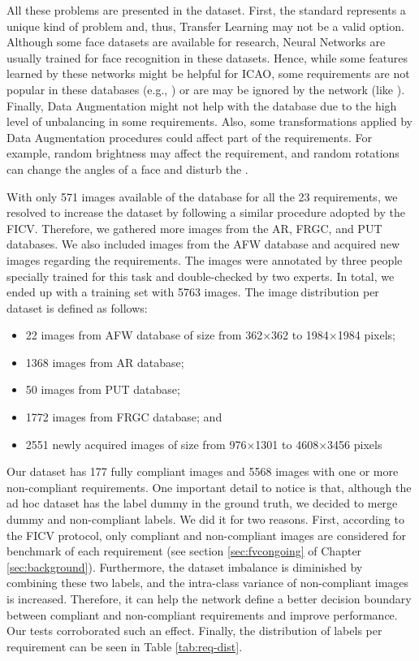  All these problems are presented in the \ficvtest dataset. First, the \icao standard represents a unique kind of problem and, thus, Transfer Learning may not be a valid option. Although some face datasets are available for research, Neural Networks are usually trained for face recognition in these datasets. Hence, while some features learned by these networks might be helpful for ICAO, some requirements are not popular in these databases (e.g., \citeReq{\inkmarked}) or are may be ignored by the network (like \citeReq{\variedbackground}). Finally, Data Augmentation might not help with the \ficvtest database due to the high level of unbalancing in some requirements. Also, some transformations applied by Data Augmentation procedures could affect part of the requirements. For example, random brightness may affect the  \citeReq{\toodarklight} requirement, and random rotations can change the angles of a face and disturb the \citeReq{\rollpitchyaw}.
 
 With only 571 images available of the \ficvtest database for all the 23 requirements, we resolved to increase the dataset by following a similar procedure adopted by the FICV. Therefore, we gathered more images from the AR, FRGC, and PUT databases. We also included images from the AFW database \citep{databaseAFW} and acquired new images regarding the \icao requirements. The images were annotated by three people specially trained for this task and double-checked by two experts. In total, we ended up with a training set with 5763 images. The image distribution per dataset is defined as follows:

\begin{itemize}
\item 22 images from AFW database of size from 362$\times$362 to 1984$\times$1984 pixels;
\item 1368 images from AR database;
\item 50 images from PUT database;
\item 1772 images from FRGC database; and
\item 2551 newly acquired images of size from 976$\times$1301 to 4608$\times$3456 pixels
\end{itemize}

Our dataset has 177 fully compliant images and 5568 images with one or more non-compliant requirements. One important detail to notice is that, although the ad hoc dataset has the label dummy in the ground truth, we decided to merge dummy and non-compliant labels. We did it for two reasons. First, according to the FICV protocol, only compliant and non-compliant images are considered for benchmark of each requirement (see section \ref{sec:fvcongoing} of Chapter \ref{sec:background}). Furthermore, the dataset imbalance is diminished by combining these two labels, and the intra-class variance of non-compliant images is increased. Therefore, it can help the network define a better decision boundary between compliant and non-compliant requirements and improve performance. Our tests corroborated such an effect. Finally, the distribution of labels per requirement can be seen in Table \ref{tab:req-dist}. 

